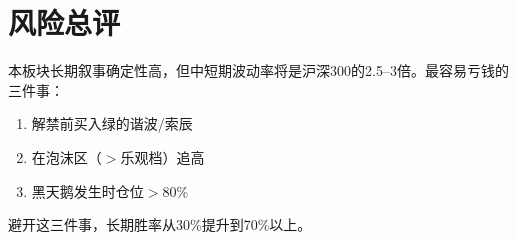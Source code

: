 \section{风险总评}

\begin{keyinsight}[一句话风控结论]
本板块长期叙事确定性高，但中短期波动率将是沪深300的2.5--3倍。最容易亏钱的三件事：
\begin{enumerate}[leftmargin=1.5em]
  \item 解禁前买入绿的谐波/索辰
  \item 在泡沫区（$>$乐观档）追高
  \item 黑天鹅发生时仓位$>$80\%
\end{enumerate}
避开这三件事，长期胜率从30\%提升到70\%以上。
\end{keyinsight}
